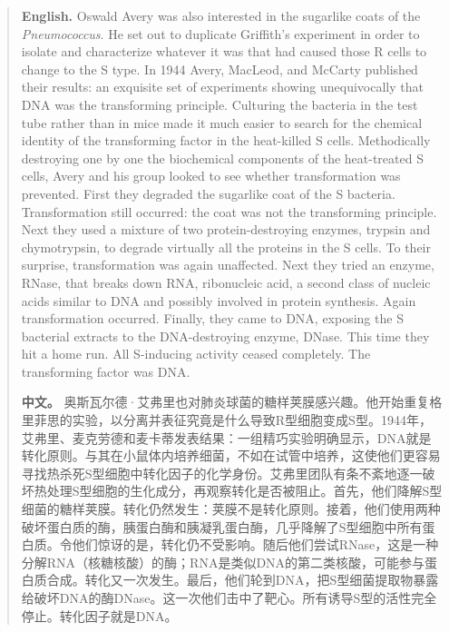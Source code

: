 \begin{quote}
\noindent\textbf{English.} Oswald Avery was also interested in the sugarlike coats of the \emph{Pneumococcus}. He set out to duplicate Griffith's experiment in order to isolate and characterize whatever it was that had caused those R cells to change to the S type. In 1944 Avery, MacLeod, and McCarty published their results: an exquisite set of experiments showing unequivocally that DNA was the transforming principle. Culturing the bacteria in the test tube rather than in mice made it much easier to search for the chemical identity of the transforming factor in the heat-killed S cells. Methodically destroying one by one the biochemical components of the heat-treated S cells, Avery and his group looked to see whether transformation was prevented. First they degraded the sugarlike coat of the S bacteria. Transformation still occurred: the coat was not the transforming principle. Next they used a mixture of two protein-destroying enzymes, trypsin and chymotrypsin, to degrade virtually all the proteins in the S cells. To their surprise, transformation was again unaffected. Next they tried an enzyme, RNase, that breaks down RNA, ribonucleic acid, a second class of nucleic acids similar to DNA and possibly involved in protein synthesis. Again transformation occurred. Finally, they came to DNA, exposing the S bacterial extracts to the DNA-destroying enzyme, DNase. This time they hit a home run. All S-inducing activity ceased completely. The transforming factor was DNA.

\smallskip
\noindent\textbf{中文。} 奥斯瓦尔德·艾弗里也对肺炎球菌的糖样荚膜感兴趣。他开始重复格里菲思的实验，以分离并表征究竟是什么导致R型细胞变成S型。1944年，艾弗里、麦克劳德和麦卡蒂发表结果：一组精巧实验明确显示，DNA就是转化原则。与其在小鼠体内培养细菌，不如在试管中培养，这使他们更容易寻找热杀死S型细胞中转化因子的化学身份。艾弗里团队有条不紊地逐一破坏热处理S型细胞的生化成分，再观察转化是否被阻止。首先，他们降解S型细菌的糖样荚膜。转化仍然发生：荚膜不是转化原则。接着，他们使用两种破坏蛋白质的酶，胰蛋白酶和胰凝乳蛋白酶，几乎降解了S型细胞中所有蛋白质。令他们惊讶的是，转化仍不受影响。随后他们尝试RNase，这是一种分解RNA（核糖核酸）的酶；RNA是类似DNA的第二类核酸，可能参与蛋白质合成。转化又一次发生。最后，他们轮到DNA，把S型细菌提取物暴露给破坏DNA的酶DNase。这一次他们击中了靶心。所有诱导S型的活性完全停止。转化因子就是DNA。
\end{quote}

